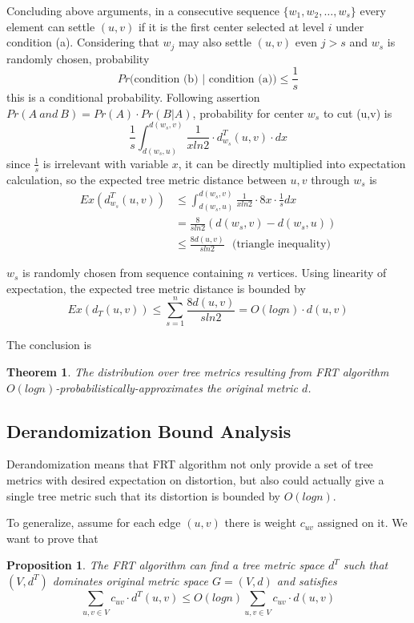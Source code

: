 \documentclass[11pt,twoside, onecolumn]{IEEEtran}
\newtheorem{Proposition}{Proposition}[section]
\newtheorem{Theorem}{Theorem}[section]
\begin{document}
Concluding above arguments, in a consecutive sequence $\{w_1,w_2,\dots,w_s\}$ every element can
settle $(u,v)$ if it is the first center selected at level $i$ under condition (a). Considering
that $w_j$ may also settle $(u,v)$ even $j>s$ and $w_s$ is randomly chosen, probability
$$Pr\text{(condition\ (b) } | \text{ condition\ (a))} \leq \frac{1}{s}$$
this is a conditional probability. Following assertion $Pr(A\ and\ B) = Pr(A)\cdot Pr(B|A)$,
probability for center $w_s$ to cut (u,v) is 
$$\frac{1}{s}\int_{d(w_s,u)}^{d(w_s,v)}\frac{1}{xln2}\cdot d_{w_s}^T(u,v)\cdot dx$$
since $\frac{1}{s}$ is irrelevant with variable $x$, it can be directly multiplied into
expectation calculation, so the expected tree metric distance between $u,v$ through $w_s$ is
\begin{align}
Ex\left(d_{w_s}^T(u,v)\right)
&\leq \int_{d(w_s,u)}^{d(w_s,v)}\frac{1}{xln2}\cdot 8x\cdot\frac{1}{s} dx\nonumber\\
&=\frac{8}{sln2}(d(w_s,v)-d(w_s,u))\\
&\leq \frac{8d(u,v)}{sln2}\ \ \ \text{(triangle\ inequality)}
\end{align} 

$w_s$ is randomly chosen from sequence containing $n$ vertices. Using linearity of expectation,
the expected tree metric distance is bounded by
$$Ex(d_T(u,v)) \leq \sum_{s=1}^{n}\frac{8d(u,v)}{sln2} = O(logn)\cdot d(u,v)$$

The conclusion is
\begin{Theorem}
The distribution over tree metrics resulting from FRT algorithm $O(logn)$-probabilistically-approximates the original metric $d$.
\end{Theorem}
\subsection{Derandomization Bound Analysis}
Derandomization means that FRT algorithm not only provide a set of tree metrics with desired expectation
on distortion, but also could actually give a single tree metric such that its distortion is bounded by $O(logn)$.

To generalize, assume for each edge $(u,v)$ there is weight $c_{uv}$ assigned on it. 
We want to prove that
\begin{Proposition}
The FRT algorithm can find a tree metric space $d^T$ such that $(V,d^T)$ dominates original metric space
$G = (V,d)$
and satisfies $$\sum_{u,v\in V}c_{uv}\cdot d^T(u,v)\leq O(logn)\sum_{u,v\in V}c_{uv}\cdot d(u,v)$$
\end{Proposition}
\end{document}
